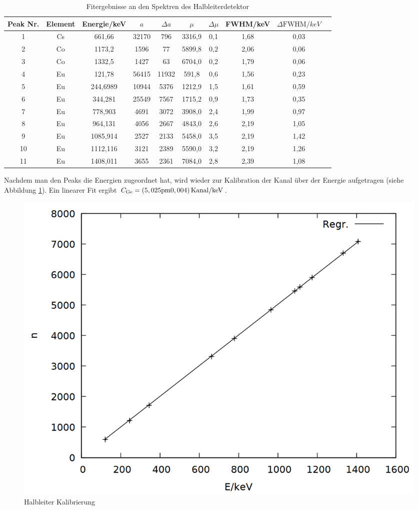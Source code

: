 \newpage

\begin{table}[h]
\caption{Fitergebnisse an den Spektren des Halbleiterdetektor}
\begin{tabular}{cccccccccc}
\toprule
Peak Nr. & Element & Energie/\si{keV}& $a$ & $\Delta a$ & $\mu$ & $\Delta \mu$ & FWHM/\si{keV} & $\Delta \text{FWHM}/\si{keV}$\\
\midrule 
1	&	Cs	&	661,66	&	32170	&	796	&	3316,9	&	0,1	&	1,68	&	0,03\\
2	&	Co	&	1173,2	&	1596	&	77	&	5899,8	&	0,2	&	2,06	&	0,06\\
3	&	Co	&	1332,5	&	1427	&	63	&	6704,0	&	0,2	&	1,79	&	0,06\\
4	&	Eu	&	121,78	&	56415	&	11932	&	591,8	&	0,6	&	1,56	&	0,23\\
5	&	Eu	&	244,6989	&	10944	&	5376	&	1212,9	&	1,5	&	1,61	&	0,59\\
6	&	Eu	&	344,281	&	25549	&	7567	&	1715,2	&	0,9	&	1,73	&	0,35\\
7	&	Eu	&	778,903	&	4691	&	3072	&	3908,0	&	2,4	&	1,99	&	0,97\\
8	&	Eu	&	964,131	&	4056	&	2667	&	4843,0	&	2,6	&	2,19	&	1,05\\
9	&	Eu	&	1085,914	&	2527	&	2133	&	5458,0	&	3,5	&	2,19	&	1,42\\
10	&	Eu	&	1112,116	&	3121	&	2389	&	5590,0	&	3,2	&	2,19	&	1,26\\
11	&	Eu	&	1408,011	&	3655	&	2361	&	7084,0	&	2,8	&	2,39	&	1,08\\
\bottomrule
\end{tabular}
\label{tab:ge}
\end{table}

Nachdem man den Peaks die Energien zugeordnet hat, wird wieder zur Kalibration der Kanal über der Energie aufgetragen (siehe Abbildung \ref{fig:ge_gauge}). Ein linearer Fit ergibt $C\ind{Ge} = \si{(5,025\pm 0,004)\,Kanal/keV}$.

\begin{figure}[h]
\centering
\includegraphics[width=0.7\linewidth]{data/ge_gauge.png}
\caption{Halbleiter Kalibrierung}
\label{fig:ge_gauge}
\end{figure}

